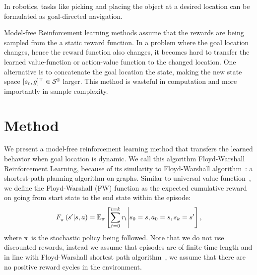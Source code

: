In robotics, tasks like picking and placing the object at a desired
location can be formulated as goal-directed navigation.

Model-free Reinforcement learning methods assume that the rewards are
being sampled from the a static reward function.  In a problem where the
goal location changes, hence the reward function also changes, it
becomes hard to transfer the learned value-function or action-value
function to the changed location.  One alternative is to concatenate the
goal location the state, making the new state space $[s_t,
g]^\top \in \mathcal{S}^2$ larger.  This method is wasteful in
computation and more importantly in sample complexity.

\section{Method}
We present a model-free reinforcement learning method that transfers the
learned behavior when goal location is dynamic. We call this algorithm
Floyd-Warshall Reinforcement Learning, because of its similarity to
Floyd-Warshall algorithm~\cite{floydwarshall1962}:
a shortest-path planning algorithm on graphs. Similar
to universal value function~\cite{schaul2015universal}, we define the Floyd-Warshall
(FW) function as the expected cumulative reward on going from start state to the
end state within the episode:
%
\begin{align}
F_{\pi}^{}\left({s'}\middle|{s}, {a}\right) =
\mathbb{E}_{\pi}\left[ \sum_{t=0}^{t=k} r_t \middle\vert s_0 = s, a_0 = s, s_k = s' \right] ,
\end{align}%
%
where $\pi$ is the
stochastic policy being followed.
Note that we do not use discounted rewards, instead we assume that episodes are
of finite time length and in line with Floyd-Warshall shortest path
algorithm~\cite{floydwarshall1962}, we assume that there are no positive reward
cycles in the environment.

